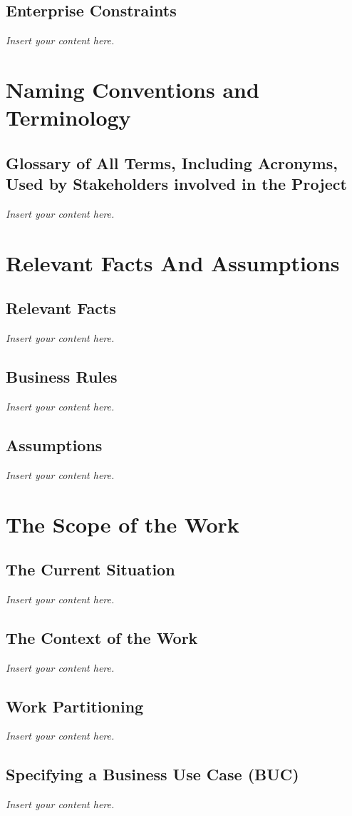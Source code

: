 \documentclass[12pt]{article}
\newcommand{\lips}{\textit{Insert your content here.}}
\begin{document}
\subsection{Enterprise Constraints}
\lips

\section{Naming Conventions and Terminology}
\subsection{Glossary of All Terms, Including Acronyms, Used by Stakeholders
involved in the Project}
\lips

\section{Relevant Facts And Assumptions}
\subsection{Relevant Facts}
\lips
\subsection{Business Rules}
\lips
\subsection{Assumptions}
\lips

\section{The Scope of the Work}
\subsection{The Current Situation}
\lips
\subsection{The Context of the Work}
\lips
\subsection{Work Partitioning}
\lips
\subsection{Specifying a Business Use Case (BUC)}
\lips
\end{document}
